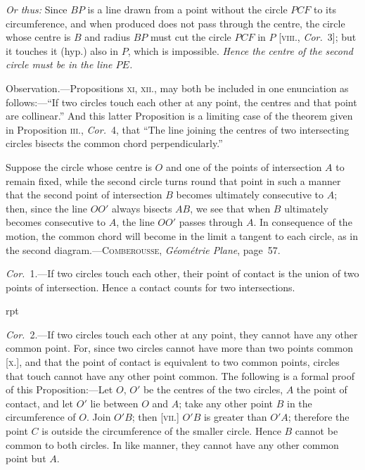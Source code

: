 \documentclass[oneside]{book}
\newcommand\imgflow[3]{
\setcounter{wrapwidth}{#1}
\begin{wrapfigure}[#2]{r}{\value{wrapwidth}pt}
\begin{center}
\vspace{-0.3in}
\end{center}
\end{wrapfigure}
}
\newcommand\imgcent[2]{
\begin{center}
\end{center}
}
\begin{document}
\textit{Or thus:} Since $BP$ is a line drawn from a point without
the circle $PCF$ to its circumference, and when produced
does not pass through the centre, the circle
whose centre is $B$ and radius $BP$ must cut the circle
$PCF$ in $P$ [\textsc{viii.}, \textit{Cor.}~3]; but it touches it (hyp.) also
in $P$, which is impossible. \textit{Hence the centre of the
second circle must be in the line $PE$.}\par\medskip

\begin{footnotesize}
\textsf{Observation.}---Propositions \textsc{xi, xii.}, may both be included in
one enunciation as follows:---``If two circles touch each other at
any point, the centres and that point are collinear.'' And this
latter Proposition is a limiting case of the theorem given in Proposition \textsc{iii.},
\textit{Cor.}~4, that ``The line joining the centres of two
intersecting circles bisects the common chord perpendicularly.''

\imgcent{313}{f116}

Suppose the circle whose centre is $O$ and one of the points of
intersection $A$ to remain fixed, while the second circle turns
round that point in such a manner that the second point of
intersection $B$ becomes ultimately consecutive to $A$; then, since
the line $OO'$ always bisects $AB$, we see that when $B$ ultimately
becomes consecutive to $A$, the line $OO'$ passes through $A$. In
consequence of the motion, the common chord will become in
the limit a tangent to each circle, as in the second diagram.---\textsc{Comberousse},
\textit{G\'eom\'etrie Plane}, page~57.

\textit{Cor.}~1.---If two circles touch each other, their point of contact
is the union of two points of intersection. Hence a contact
counts for two intersections.

\newpage
\imgflow{100}{9}{f117}
\textit{Cor.}~2.---If two circles touch each other at any point, they
cannot have any other common point. For, since two circles
cannot have more than two points
common [\textsc{x.}], and that the point of contact
is equivalent to two common points,
circles that touch cannot have any
other point common. The following is
a formal proof of this Proposition:---Let
$O$, $O'$ be the centres of the two circles,
$A$ the point of contact, and let $O'$ lie
between $O$ and $A$; take any other point
$B$ in the circumference of $O$. Join $O'B$;
then [\textsc{vii.}] $O'B$ is greater than $O'A$; therefore the point $C$ is
outside the circumference of the smaller circle. Hence $B$ cannot
be common to both circles. In like manner, they cannot have
any other common point but $A$.
\par\end{footnotesize}
\end{document}
